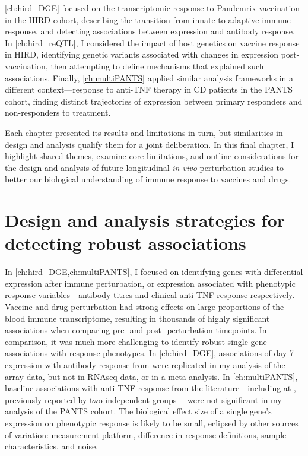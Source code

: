 \cref{ch:hird_DGE} focused on the transcriptomic response to Pandemrix vaccination in the \gls{HIRD} cohort,
describing the transition from innate to adaptive immune response,
and detecting associations between expression and antibody response.
In \cref{ch:hird_reQTL}, 
I considered the impact of host genetics on vaccine response in \gls{HIRD},
identifying genetic variants associated with changes in expression post-vaccination,
then attempting to define mechanisms that explained such associations.
Finally, \cref{ch:multiPANTS} applied similar analysis frameworks in a different context---response to anti-\gls{TNF} therapy in \gls{CD} patients in the \gls{PANTS} cohort,
finding distinct trajectories of expression between primary responders and non-responders to treatment. 

Each chapter presented its results and limitations in turn,
but similarities in design and analysis qualify them for a joint deliberation.
In this final chapter,
I highlight shared themes,
examine core limitations,
and outline considerations for the design and analysis of future longitudinal \textit{in vivo} perturbation studies
to better our biological understanding of immune response to vaccines and drugs.

\section{Design and analysis strategies for detecting robust associations}

In \cref{ch:hird_DGE,ch:multiPANTS}, I focused on identifying genes with differential expression after immune perturbation, 
or expression associated with phenotypic response variables---antibody titres and clinical anti-\gls{TNF} response respectively.
Vaccine and drug perturbation had strong effects on large proportions of the blood immune transcriptome, 
resulting in thousands of highly significant associations when comparing pre- and post- perturbation timepoints.
In comparison, it was much more challenging to identify robust single gene associations with response phenotypes.
In \cref{ch:hird_DGE}, associations of day 7 expression with antibody response from \textcite{sobolev2016AdjuvantedInfluenzaH1N1Vaccination} were replicated in my analysis of the array data, but not in \gls{RNAseq} data, or in a meta-analysis.
In \cref{ch:multiPANTS}, baseline associations with anti-\gls{TNF} response from the literature---including at , previously reported by two independent groups \autocite{gaujoux2019CellcentredMetaanalysisReveals,verstockt2019LowTREM1Expression}---were not significant in my analysis of the \gls{PANTS} cohort.
The biological effect size of a single gene's expression on phenotypic response is likely to be small, eclipsed by other sources of variation: 
measurement platform, difference in response definitions, sample characteristics, and noise.

